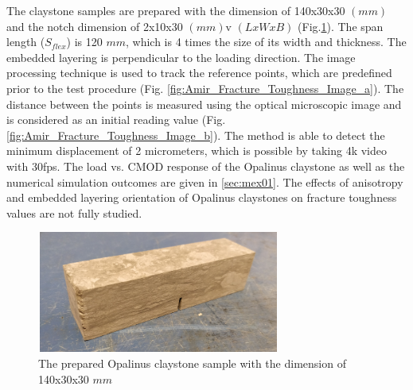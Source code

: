 The claystone samples are prepared with the dimension of 140x30x30 $(mm)$ and the notch dimension of 2x10x30 $(mm)$v $(LxWxB)$  (Fig.\ref{fig:Amir_Fracture_Toughness_Sample}). The span length ($S_{flex}$) is 120 $mm$, which is 4 times the size of its width and thickness. The embedded layering is perpendicular to the loading direction. The image processing technique is used to track the reference points, which are predefined prior to the test procedure (Fig. \ref{fig:Amir_Fracture_Toughness_Image_a}). The distance between the points is measured using the optical microscopic image and is considered as an initial reading value (Fig. \ref{fig:Amir_Fracture_Toughness_Image_b}). The method is able to detect the minimum displacement of 2 micrometers, which is possible by taking 4k video with 30fps. The load vs. CMOD response of the Opalinus claystone as well as the numerical simulation outcomes are given in \ref{sec:mex01}. The effects of anisotropy and embedded layering orientation of Opalinus claystones on fracture toughness values are not fully studied. 

\begin{figure}[!ht]
\centering
\includegraphics[width=8cm,height=4cm]{figures/Amir_Fracture_Toughness_Sample.png}
\caption{The prepared Opalinus claystone sample with the dimension of 140x30x30 $mm$}
\label{fig:Amir_Fracture_Toughness_Sample}
\end{figure} 

